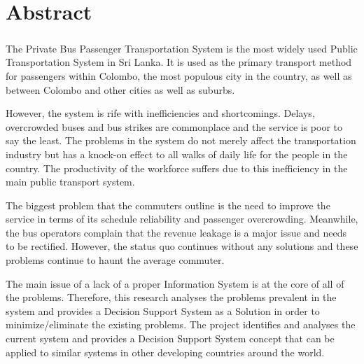 \clearpage
\chapter*{Abstract}

\paragraph{ } The Private Bus Passenger Transportation System is the most widely used Public Transportation System in Sri Lanka. It is used as the primary transport method for passengers within Colombo, the most populous city in the country, as well as between Colombo and other cities as well as suburbs.

However, the system is rife with inefficiencies and shortcomings. Delays, overcrowded buses and bus strikes are commonplace and the service is poor to say the least. The problems in the system do not merely affect the transportation industry but has a knock-on effect to all walks of daily life for the people in the country. The productivity of the workforce suffers due to this inefficiency in the main public transport system.

The biggest problem that the commuters outline is the need to improve the service in terms of its schedule reliability and passenger overcrowding. Meanwhile, the bus operators complain that the revenue leakage is a major issue and needs to be rectified. However, the status quo continues without any solutions and these problems continue to haunt the average commuter.

The main issue of a lack of a proper Information System is at the core of all of the problems. Therefore, this research analyses the problems prevalent in the system and provides a Decision Support System as a Solution in order to minimize/eliminate the existing problems. The project identifies and analyses the current system and provides a Decision Support System concept that can be applied to similar systems in other developing countries around the world.